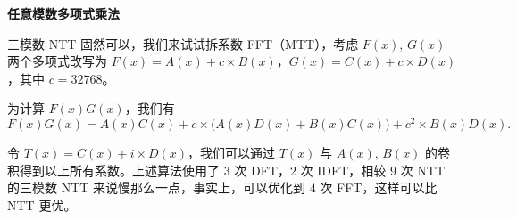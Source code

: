 \textbf{任意模数多项式乘法}

三模数 NTT 固然可以，我们来试试拆系数 FFT（MTT），考虑 $F(x),\,G(x)$ 两个多项式改写为 $F(x) = A(x) + c \times B(x)$，$G(x) = C(x) + c \times D(x)$，其中 $c = 32768$。

为计算 $F(x)G(x)$，我们有
\[
F(x)G(x) = A(x)C(x) + c \times \bigl(A(x)D(x) + B(x)C(x)\bigr) + c^2 \times B(x)D(x).
\]

令 $T(x) = C(x) + i \times D(x)$，我们可以通过 $T(x)$ 与 $A(x),\,B(x)$ 的卷积得到以上所有系数。上述算法使用了 $3$ 次 DFT，$2$ 次 IDFT，相较 $9$ 次 NTT 的三模数 NTT 来说慢那么一点，事实上，可以优化到 $4$ 次 FFT，这样可以比 NTT 更优。